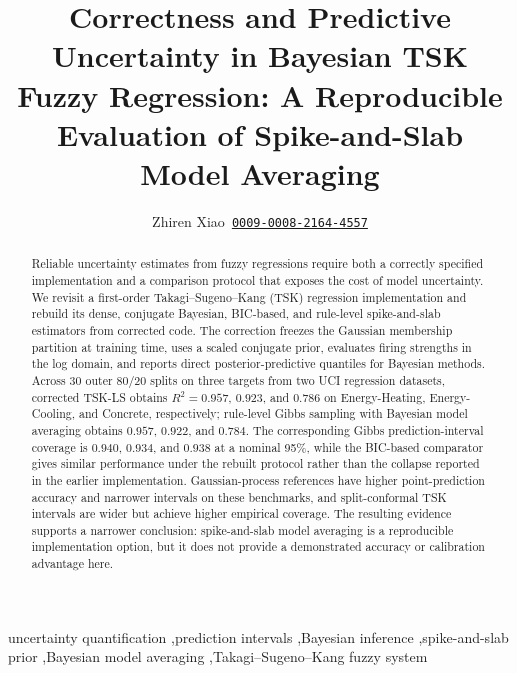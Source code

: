 \documentclass[1p,times]{elsarticle}
\providecommand{\orcid}[1]{\href{https://orcid.org/#1}{\texttt{#1}}}
\begin{document}
\begin{frontmatter}

\title{Correctness and Predictive Uncertainty in Bayesian TSK Fuzzy Regression: A Reproducible Evaluation of Spike-and-Slab Model Averaging}

\author[addr]{Zhiren Xiao~\orcid{0009-0008-2164-4557}}
\address[addr]{Guangdong University of Finance, Guangzhou, China}

\begin{abstract}
Reliable uncertainty estimates from fuzzy regressions require both a correctly specified implementation and a comparison protocol that exposes the cost of model uncertainty.
We revisit a first-order Takagi--Sugeno--Kang (TSK) regression implementation and rebuild its dense, conjugate Bayesian, BIC-based, and rule-level spike-and-slab estimators from corrected code.
The correction freezes the Gaussian membership partition at training time, uses a scaled conjugate prior, evaluates firing strengths in the log domain, and reports direct posterior-predictive quantiles for Bayesian methods.
Across 30 outer 80/20 splits on three targets from two UCI regression datasets, corrected TSK-LS obtains $R^2=0.957$, $0.923$, and $0.786$ on Energy-Heating, Energy-Cooling, and Concrete, respectively; rule-level Gibbs sampling with Bayesian model averaging obtains $0.957$, $0.922$, and $0.784$.
The corresponding Gibbs prediction-interval coverage is $0.940$, $0.934$, and $0.938$ at a nominal 95\%, while the BIC-based comparator gives similar performance under the rebuilt protocol rather than the collapse reported in the earlier implementation.
Gaussian-process references have higher point-prediction accuracy and narrower intervals on these benchmarks, and split-conformal TSK intervals are wider but achieve higher empirical coverage.
The resulting evidence supports a narrower conclusion: spike-and-slab model averaging is a reproducible implementation option, but it does not provide a demonstrated accuracy or calibration advantage here.
\end{abstract}

\begin{keyword}
uncertainty quantification \sep prediction intervals \sep Bayesian inference \sep spike-and-slab prior \sep Bayesian model averaging \sep Takagi--Sugeno--Kang fuzzy system
\end{keyword}

\end{frontmatter}

\end{document}
